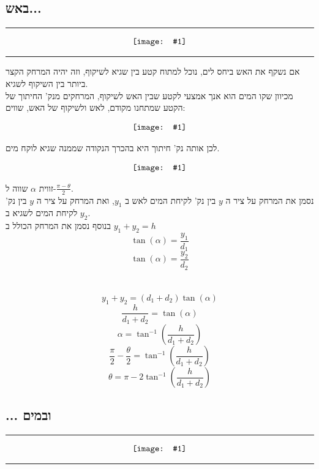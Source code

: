 \documentclass{article}
\newcommand{\image}[2]{
    \begin{align*}
        \centering
        \texttt{[image: \#1]}
    \end{align*}
}
\newcommand{\qimage}[2]{
    \hrule
    \image{#1}{#2}
    \hrule
    \vspace{8pt}
}
\begin{document}
\newpage
\subsection*{באש...}
\qimage{images/questions_screenshots/Screenshot 2023-10-16 180422.png}{0.5}

אם נשקף את האש ביחס לים, נוכל למתוח קטע בין שגיא לשיקוף, וזה יהיה המרחק הקצר ביותר בין השיקוף לשגיא.\\
מכיוון שקו המים הוא אנך אמצעי לקטע שבין האש לשיקוף, המרחקים מנק' החיתוך של הקטע שמתחנו מקודם, לאש ולשיקוף של האש, שווים:
\image{images/geogebra-export.png}{0.4}
לכן אותה נק' חיתוך היא בהכרך הנקודה שממנה שגיא לוקח מים.
\image{images/on_fire_figure_with_angles.png}{0.4}
זווית $\alpha$ שווה ל-$\frac{\pi - \theta}{2}$.\\
נסמן את המרחק על ציר ה
$y$ 
בין נק' לקיחת המים לאש ב
$y_1$,
ואת המרחק על ציר ה
$y$
בין נק' לקיחת המים לשגיא ב
$y_2$.\\
בנוסף נסמן את המרחק הכולל ב
$y_1+y_2 = h$
\begin{equation*}
    \tan (\alpha) = \frac{y_1}{d_1}
\end{equation*}
\begin{equation*}
    \tan (\alpha) = \frac{y_2}{d_2}
\end{equation*}
\\
\\
\begin{equation*}
    y_1 + y_2 = (d_1 + d_2)\tan (\alpha) 
\end{equation*}
\begin{equation*}
    \frac{h}{d_1 + d_2} = \tan (\alpha) 
\end{equation*}
\begin{equation*}
    \alpha = \tan ^ {-1} \left( \frac{h}{d_1 + d_2} \right)
\end{equation*}
\begin{equation*}
    \frac{\pi}{2} - \frac{\theta}{2} = \tan ^ {-1}\left( \frac{h}{d_1 + d_2} \right)
\end{equation*}
\begin{equation*}
    \theta = \pi - 2\tan ^ {-1} \left( \frac{h}{d_1 + d_2} \right)
\end{equation*}


\newpage
\subsection*{... ובמים}
\qimage{images/questions_screenshots/Screenshot 2023-10-16 180434.png}{0.5}
\end{document}
